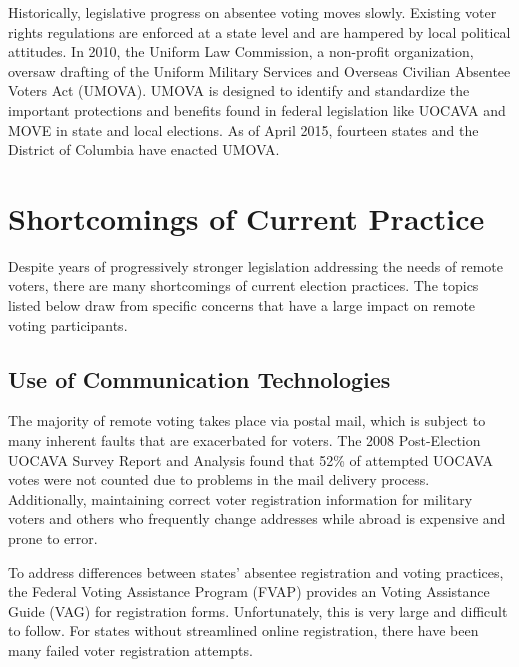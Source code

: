 
Historically, legislative progress on absentee voting moves
slowly. Existing voter rights regulations are enforced at a state
level and are hampered by local political attitudes. In 2010, the
Uniform Law Commission, a non-profit organization, oversaw drafting of
the Uniform Military Services and Overseas Civilian Absentee Voters
Act (UMOVA). UMOVA is designed to identify and standardize the
important protections and benefits found in federal legislation like
UOCAVA and MOVE in state and local elections. As of April 2015,
fourteen states and the District of Columbia have enacted UMOVA.

\section{Shortcomings of Current Practice}

Despite years of progressively stronger legislation addressing the
needs of remote voters, there are many shortcomings of current
election practices. The topics listed below draw from specific
concerns that have a large impact on remote voting participants.

\subsection{Use of Communication Technologies}
The majority of remote voting takes place via postal mail, which is
subject to many inherent faults that are exacerbated for voters. The
2008 Post-Election UOCAVA Survey Report and Analysis found that 52\%
of attempted UOCAVA votes were not counted due to problems in the mail
delivery process. Additionally, maintaining correct voter registration
information for military voters and others who frequently change
addresses while abroad is expensive and prone to error.



To address differences between states' absentee registration and
voting practices, the Federal Voting Assistance Program (FVAP) provides an
Voting Assistance Guide (VAG) for registration forms. Unfortunately, this is
very large and difficult to follow. For states without streamlined
online registration, there have been many failed voter registration
attempts.

